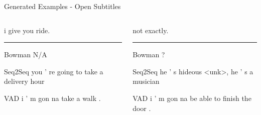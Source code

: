 \documentclass[aspectratio=169, 11pt]{beamer}
\begin{document}
\begin{frame}{Generated Examples - Open Subtitles}
  \small
  \begin{columns}
    \begin{column}{0.5\textwidth}
      i give you ride.
      \noindent\rule{\textwidth}{0.4pt}
      \begin{block}{Bowman}
        N/A 
      \end{block}
      \begin{block}{Seq2Seq}
        you ' re going to take a delivery hour
      \end{block}
      \begin{block}{VAD}
        i ' m gon na take a walk . 
      \end{block}
    \end{column}
    \begin{column}{0.5\textwidth}
      not exactly.
      \noindent\rule{\textwidth}{0.4pt}
      \begin{block}{Bowman}
        ?
      \end{block}
      \begin{block}{Seq2Seq}
        he ' s hideous \textless{}unk\textgreater\space ,  he ' s a musician
      \end{block}
      \begin{block}{VAD}
        i ' m gon na be able to finish the door . 
      \end{block}
    \end{column}
  \end{columns}
\end{frame}
\end{document}
